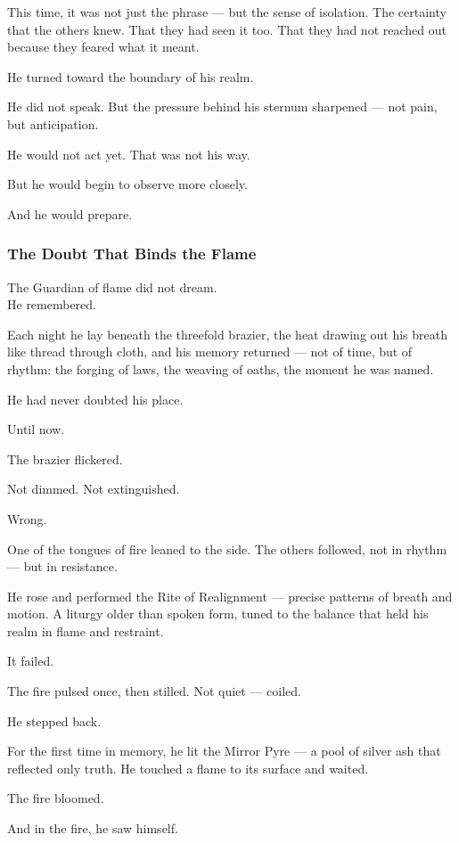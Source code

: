 \documentclass[12pt]{article}
\begin{document}
This time, it was not just the phrase — but the sense of isolation. The certainty that the others knew. That they had seen it too. That they had not reached out because they feared what it meant.

He turned toward the boundary of his realm.

He did not speak. But the pressure behind his sternum sharpened — not pain, but anticipation.

He would not act yet. That was not his way.

But he would begin to observe more closely.

And he would prepare.


\dotfill

\subsubsection*{The Doubt That Binds the Flame}

The Guardian of flame did not dream.\\
He remembered.

Each night he lay beneath the threefold brazier, the heat drawing out his breath like thread through cloth, and his memory returned — not of time, but of rhythm: the forging of laws, the weaving of oaths, the moment he was named.

He had never doubted his place.

Until now.

The brazier flickered.

Not dimmed. Not extinguished.

Wrong.

One of the tongues of fire leaned to the side. The others followed, not in rhythm — but in resistance.

He rose and performed the Rite of Realignment — precise patterns of breath and motion. A liturgy older than spoken form, tuned to the balance that held his realm in flame and restraint.

It failed.

The fire pulsed once, then stilled. Not quiet — coiled.

He stepped back.

For the first time in memory, he lit the Mirror Pyre — a pool of silver ash that reflected only truth. He touched a flame to its surface and waited.

The fire bloomed.

And in the fire, he saw himself.
\end{document}
